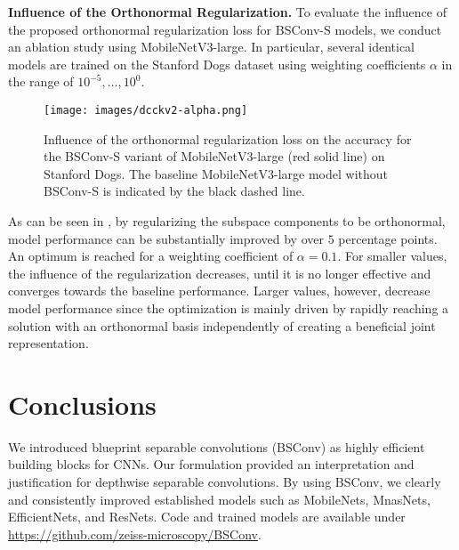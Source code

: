 \documentclass[10pt,twocolumn,letterpaper]{article}
\newcommand{\DCCK}{BSConv\xspace}
\newcommand{\DCCKS}{\DCCK-S\xspace}
\begin{document}
\textbf{Influence of the Orthonormal Regularization.}
To evaluate the influence of the proposed orthonormal regularization loss for \DCCKS models, we conduct an ablation study using MobileNetV3-large.
In particular, several identical models are trained on the Stanford Dogs dataset using weighting coefficients $\alpha$ in the range of $10^{-5}, \ldots, 10^{0}$.

\begin{figure}
	\center
	\texttt{[image: images/dcckv2-alpha.png]}
	\caption{Influence of the orthonormal regularization loss on the accuracy for the \DCCKS variant of MobileNetV3-large (red solid line) on Stanford Dogs.
		The baseline MobileNetV3-large model without \DCCKS is indicated by the black dashed line.
	}
     \label{fig:dcckV2Alpha}
\end{figure}

As can be seen in , by regularizing the subspace components to be orthonormal, model performance can be substantially improved by over $5$ percentage points.
An optimum is reached for a weighting coefficient of $\alpha=0.1$.
For smaller values, the influence of the regularization decreases, until it is no longer effective and converges towards the baseline performance.
Larger values, however, decrease model performance since the optimization is mainly driven by rapidly reaching a solution with an orthonormal basis independently of creating a beneficial joint representation.



\section{Conclusions}
We introduced blueprint separable convolutions (\DCCK) as highly efficient building blocks for CNNs.
Our formulation provided an interpretation and justification for depthwise separable convolutions.
By using \DCCK, we clearly and consistently improved established models such as MobileNets, MnasNets, EfficientNets, and ResNets.
Code and trained models are available under \url{https://github.com/zeiss-microscopy/BSConv}. 



{\small


}
\end{document}
